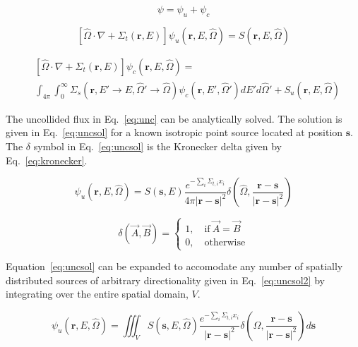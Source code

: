 \begin{equation} \label{eq:totflux}
\psi = \psi_u + \psi_c
\end{equation}

\begin{equation} \label{eq:unc}
\left[ \hat{\Omega} \cdot \nabla + \Sigma_t(\boldsymbol{r}, E) \right]
\psi_u(\boldsymbol{r}, E, \hat{\Omega}) =  S(\boldsymbol{r}, E, \hat{\Omega})
\end{equation}

\begin{equation} \label{eq:col}
\begin{split}
	&\left[ \hat{\Omega} \cdot \nabla + \Sigma_t(\boldsymbol{r}, E) \right]
	\psi_c(\boldsymbol{r}, E, \hat{\Omega}) = \\
	&\int_{4 \pi} \int_0^\infty \Sigma_s(\boldsymbol{r}, E' \rightarrow E, \hat{\Omega}' \rightarrow \hat{\Omega}) \psi_c(\boldsymbol{r}, E', \hat{\Omega}') dE' d\hat{\Omega}' + S_{u}(\boldsymbol{r}, E, \hat{\Omega})
\end{split}
\end{equation}

The uncollided flux in Eq.~\ref{eq:unc} can be analytically solved. The solution is given in Eq.~\ref{eq:uncsol} for a known isotropic point source located at position $\boldsymbol{s}$. The $\delta$ symbol in Eq.~\ref{eq:uncsol} is the Kronecker delta given by Eq.~\ref{eq:kronecker}. 

\begin{equation} \label{eq:uncsol}
\psi_u(\boldsymbol{r}, E, \hat{\Omega}) = 
S(\boldsymbol{s}, E)
\frac{e^{-\sum_i \Sigma_{t,i} x_i}}{4\pi |\boldsymbol{r}-\boldsymbol{s}|^2}
\delta\left( \hat{\Omega}, \frac{\boldsymbol{r}-\boldsymbol{s}}{|\boldsymbol{r}-\boldsymbol{s}|^2}\right)
\end{equation}

\begin{equation} \label{eq:kronecker}
\delta(\vec{A}, \vec{B}) = 
\begin{cases}
1, \quad \mathrm{if} \ \vec{A}=\vec{B} \\
0, \quad \mathrm{otherwise}
\end{cases}
\end{equation}

Equation~\ref{eq:uncsol} can be expanded to accomodate any number of spatially distributed sources of arbitrary directionality given in Eq.~\ref{eq:uncsol2} by integrating over the entire spatial domain, $V$.

\begin{equation} \label{eq:uncsol2}
\psi_u(\boldsymbol{r}, E, \hat{\Omega}) = \iiint_{V}
S(\boldsymbol{s}, E, \hat{\Omega})
\frac{e^{-\sum_i \Sigma_{t,i} x_i}}{|\boldsymbol{r}-\boldsymbol{s}|^2}
\delta\left( \hat{\Omega}, \frac{\boldsymbol{r}-\boldsymbol{s}}{|\boldsymbol{r}-\boldsymbol{s}|^2}\right)
d \boldsymbol{s}
\end{equation}

